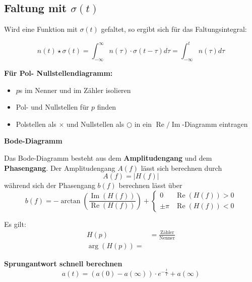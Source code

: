 \documentclass[12pt, a4paper]{scrartcl}
\begin{document}
\subsection{Faltung mit \(\sigma (t)\)}

Wird eine Funktion mit \(\sigma (t)\) gefaltet, so ergibt sich für das Faltungsintegral:

\[
  n(t) \star \sigma (t) = \int_{-\infty}^{\infty} n(\tau) \cdot \sigma(t - \tau) d\tau = \int_{-\infty}^t n(\tau) d\tau
\]

\textbf{Für Pol- Nullstellendiagramm:}

\begin{itemize}
\item \(p\)s im Nenner und im Zähler isolieren
\item Pol- und Nullstellen für \(p\) finden
\item Polstellen als \(\times\) und Nullstellen als \(\bigcirc\) in ein \(\operatorname{Re} / \operatorname{Im}\)-Diagramm eintragen
\end{itemize}

\textbf{Bode-Diagramm}

Das Bode-Diagramm besteht aus dem \textbf{Amplitudengang} und dem \textbf{Phasengang}. Der Amplitudengang \(A(f)\) lässt sich berechnen durch
\[A(f) = |H(f)|\]
während sich der Phasengang \(b(f)\) berechnen lässt über
\[b(f) = -\arctan\left(\frac{\operatorname{Im}(H(f))}{\operatorname{Re}(H(f))}\right) +
  \begin{cases}
    0 & \operatorname{Re}(H(f)) > 0\\
    \pm \pi & \operatorname{Re}(H(f)) < 0
  \end{cases}
\]

 Es gilt:
\begin{align*}
  H(p) &= \frac{\textrm{Zähler}}{\textrm{Nenner}}\\
  \operatorname{arg}(H(p)) = 
\end{align*}

\textbf{Sprungantwort schnell berechnen}
\[a(t) = (a(0) - a(\infty)) \cdot e^{-\frac{t}{T}} + a(\infty)\]
\end{document}
